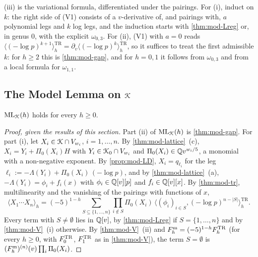 \begin{sketch}
(iii) is the variational formula, differentiated under the pairings. For (i), induct on $k$: the right side of (V1) consists of a $v$-derivative of, and pairings with, $a$ polynomial legs and $k$ log legs, and the induction starts with \cref{thm:mod-Lreg} or, in genus $0$, with the explicit $\omega_{0,3}$. For (ii), (V1) with $a=0$ reads $\langle(-\log p)^{k+1}\rangle^{\mathrm{TR}}_h=\partial_v\langle(-\log p)^k\rangle^{\mathrm{TR}}_h$, so it suffices to treat the first admissible $k$: for $h\geq2$ this is \cref{thm:mod-gap}, and for $h=0,1$ it follows from $\omega_{0,3}$ and from a local formula for $\omega_{1,1}$.
\end{sketch}

\subsection{The Model Lemma on \texorpdfstring{$\mathcal{K}$}{K}}
\label{sec:mod-MLK}

\begin{thm}
\label{thm:mod-MLK}
$\mathrm{ML}_{\mathcal{K}}(h)$ holds for every $h\geq0$.
\end{thm}

\begin{proof}[Proof, given the results of this section]
Part (ii) of $\mathrm{ML}_{\mathcal{K}}(h)$ is \cref{thm:mod-gap}. For part (i), let $X_i\in\mathcal{K}\cap V_{w_i}$, $i=1,\dots,n$. By \cref{thm:mod-lattice}~(c), $X_i=Y_i+\Pi_0(X_i)H$ with $Y_i\in\mathcal{K}_{0}\cap V_{w_i}$ and $\Pi_0(X_i)\in\mathbb{Q} v^{w_i/5}$, a monomial with a non-negative exponent. By \cref{prop:mod-LD}, $X_i=q_{\ell_i}$ for the leg $\ell_i:=-\Lambda(Y_i)+\Pi_0(X_i)\,(-\log p)$, and by \cref{thm:mod-lattice}~(a), $-\Lambda(Y_i)=\phi_i+f_i(x)$ with $\phi_i\in\mathbb{Q}[v][p]$ and $f_i\in\mathbb{Q}[v][x]$. By \cref{thm:mod-tr}, multilinearity and the vanishing of the pairings with functions of $x$,
\[
\langle X_1\cdots X_n\rangle_h=(-5)^{1-h}\sum_{S\subseteq\{1,\dots,n\}}\prod_{i\notin S}\Pi_0(X_i)\,\big\langle(\phi_i)_{i\in S},(-\log p)^{n-|S|}\big\rangle^{\mathrm{TR}}_h .
\]
Every term with $S\neq\emptyset$ lies in $\mathbb{Q}[v]$, by \cref{thm:mod-Lreg} if $S=\{1,\dots,n\}$ and by \cref{thm:mod-V}~(i) otherwise. By \cref{thm:mod-V}~(ii) and $F^{\mathrm{m}}_h=(-5)^{1-h}F^{\mathrm{TR}}_h$ (for every $h\geq0$, with $F^{\mathrm{TR}}_0$, $F^{\mathrm{TR}}_1$ as in \cref{thm:mod-V}), the term $S=\emptyset$ is $(F^{\mathrm{m}}_h)^{(n)}(v)\prod_i\Pi_0(X_i)$.
\end{proof}


